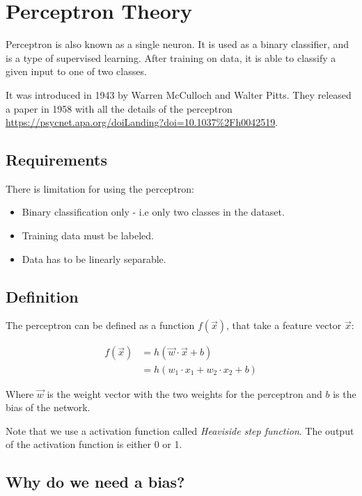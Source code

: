 \documentclass{article}
\begin{document}
    \section{Perceptron Theory}

    Perceptron is also known as a single neuron. 
    It is used as a binary classifier, and is a type of supervised learning. After training on data, it is able to classify a given input to one of two classes. 

    It was introduced in 1943 by Warren McCulloch and Walter Pitts.
    They released a paper in 1958 with all the details of the perceptron \url{https://psycnet.apa.org/doiLanding?doi=10.1037%2Fh0042519}.
    

    \subsection{Requirements}

    There is limitation for using the perceptron:

    \begin{itemize}
        \item Binary classification only - i.e only two classes in the dataset.
        \item Training data must be labeled.
        \item Data has to be linearly separable.
    \end{itemize}

    \subsection{Definition}

    The perceptron can be defined as a function $f(\vec{x})$, that take a feature vector $\vec{x}$:

    \begin{align}
        f(\vec{x}) &= h(\vec{w} \cdot \vec{x} + b) \\
                   &= h(w_1 \cdot x_1 + w_2 \cdot x_2 + b)
    \end{align}

    Where $\vec{w}$ is the weight vector with the two weights for the perceptron and $b$ is the bias of the network.
    
    Note that we use a activation function called \textit{Heaviside step function}. 
    The output of the activation function is either 0 or 1. 

    \subsection{Why do we need a bias?}
\end{document}
